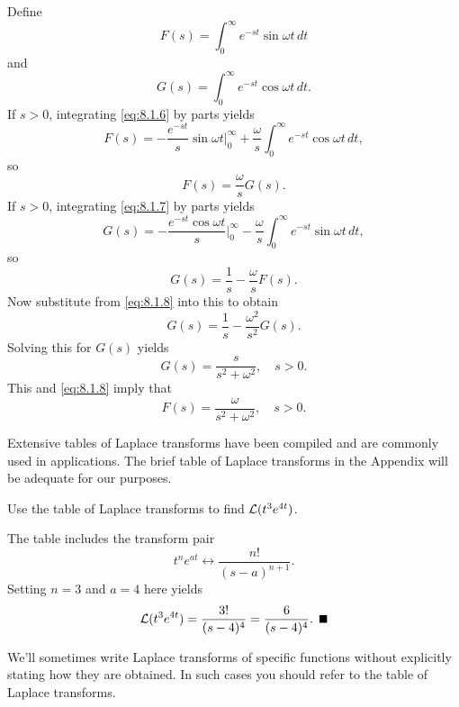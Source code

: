 \begin{examplesolution}
\solution Define
\begin{equation}
  \label{eq:8.1.6}F(s)=\int_{0}^{\infty}e^{-st}\sin\omega t\,dt
\end{equation}
and
\begin{equation}
  \label{eq:8.1.7}G(s)=\int_{0}^{\infty}e^{-st}\cos\omega t\,dt.
\end{equation}
If $s>0$, integrating \eqref{eq:8.1.6} by parts yields
\[
  F(s)=-\frac{e^{-st}}{s}\sin\omega t\Big|_{0}^{\infty}+\frac{\omega}{s}\int_{0}^{\infty}e^{-st}\cos\omega t\,dt,
\]
so
\begin{equation}
  \label{eq:8.1.8}F(s)=\frac{\omega}{s}G(s).
\end{equation}
If $s>0$, integrating \eqref{eq:8.1.7} by parts yields
\[
  G(s)=-\frac{e^{-st}\cos\omega t}{s}\Big|_{0}^{\infty}-\frac{\omega}{s}\int_{0}^{\infty}e^{-st}\sin\omega t\,dt,
\]
so
\[
  G(s)=\frac{1}{s}-\frac{\omega}{s}F(s).
\]
Now substitute from \eqref{eq:8.1.8} into this to obtain
\[
  G(s)=\frac{1}{s}-\frac{\omega^{2}}{s^{2}}G(s).
\]
Solving this for $G(s)$ yields
\[
  G(s)=\frac{s}{s^{2}+\omega^{2}},\quad s>0.
\]
This and \eqref{eq:8.1.8} imply that
\[
  F(s)=\frac{\omega}{s^{2}+\omega^{2}},\quad s>0.
\]
\end{examplesolution}


\noindent
Extensive tables of Laplace transforms have been compiled and are commonly used in applications. The
brief table of Laplace transforms in the Appendix will be adequate for our purposes.

\begin{example}
  \label{example:8.1.5}\rm Use the table of Laplace transforms to find ${\cal L}(t^{3}e^{4t})$.
\end{example}

\begin{examplesolution}
\solution The table includes the transform pair
\[
  t^{n}e^{at}\leftrightarrow\frac{n!}{(s-a)^{n+1}}.
\]
Setting $n=3$ and $a=4$ here yields
\[
  {\cal L}(t^{3}e^{4t})=\frac{3!}{(s-4)^{4}}=\frac{6}{(s-4)^{4}}.\bbox
\]
\end{examplesolution}

We'll sometimes write Laplace transforms of specific functions without explicitly stating how they
are obtained. In such cases you should refer to the table of Laplace transforms.


